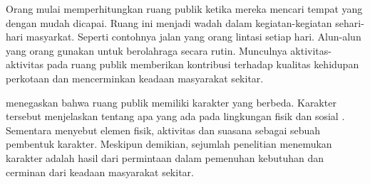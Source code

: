 \documentclass[12pt]{simart} %
\begin{document}

Orang mulai memperhitungkan ruang publik ketika mereka mencari tempat yang dengan mudah dicapai. Ruang ini menjadi wadah dalam kegiatan-kegiatan sehari-hari masyarkat. Seperti contohnya jalan yang orang lintasi setiap hari. Alun-alun yang orang gunakan untuk berolahraga secara rutin. Munculnya aktivitas-aktivitas pada ruang publik memberikan kontribusi terhadap kualitas kehidupan perkotaan dan mencerminkan keadaan masyarakat sekitar.


\cite{ahmadi2009} menegaskan bahwa ruang publik memiliki karakter yang berbeda. Karakter tersebut menjelaskan tentang apa yang ada pada lingkungan fisik dan sosial \citep{dougherty2006}. Sementara \cite{hartanti2014} menyebut elemen fisik, aktivitas dan suasana sebagai sebuah pembentuk karakter. Meskipun demikian, sejumlah penelitian menemukan karakter adalah hasil dari permintaan dalam pemenuhan kebutuhan dan cerminan dari keadaan masyarakat sekitar.


\end{document}
